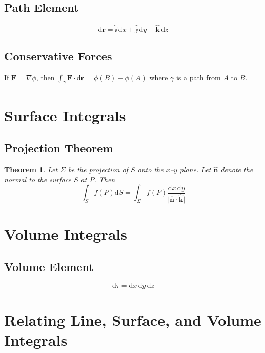 \documentclass{article}
\newtheorem*{thm}{Theorem}
\theoremstyle{definition}
\theoremstyle{definition}
\theoremstyle{remark}
\newcommand{\vecF}{\mathbf{F}}
\newcommand{\bhat}[1]{\mathbf{\hat{#1}}}
\newcommand{\ihat}{\bhat{\ii}}
\newcommand{\jhat}{\bhat{\jj}}
\newcommand{\khat}{\bhat{k}}
\newcommand{\nhat}{\bhat{n}}
\begin{document}
\subsection{Path Element}

\begin{equation*}
    \mathrm{d}\mathbf{r} = \ihat\,\mathrm{d}x + \jhat\,\mathrm{d}y + \khat\,\mathrm{d}z
\end{equation*}

\subsection{Conservative Forces}

If $\vecF = \nabla \phi$, then $\int_\gamma \vecF \cdot \mathrm{d}\mathbf{r} = \phi(B) - \phi(A)$ where $\gamma$ is a path from $A$ to $B$.

\section{Surface Integrals}

\subsection{Projection Theorem}

\begin{thm} Let $\Sigma$ be the projection of $S$ onto the $x$--$y$ plane. Let $\nhat$ denote the normal to the surface $S$ at $P$. Then
\begin{equation*}
    \int_S f(P) \mathrm{d}S = \int_\Sigma f(P) \frac{\mathrm{d}x \, \mathrm{d}y}{\lvert \nhat \cdot \khat \rvert}
\end{equation*}
\end{thm}

\section{Volume Integrals}

\subsection{Volume Element}

\begin{equation*}
    \mathrm{d}\tau = \mathrm{d}x\,\mathrm{d}y\,\mathrm{d}z
\end{equation*}

\section{Relating Line, Surface, and Volume Integrals}
\end{document}
